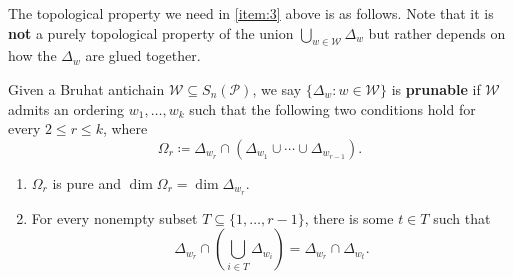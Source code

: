 
The topological property we need in \eqref{item:3} above is as follows. Note that it is \textbf{not} a purely topological property of the union $\bigcup_{w\in \mathcal W}\Delta_w$ but rather depends on how the $\Delta_w$ are glued together.

\begin{definition}\label{def:prunable}
    Given a Bruhat antichain $\mathcal{W}\subseteq S_n(\mathcal{P})$, we say $\{\Delta_w:w\in \mathcal{W}\}$ is \textbf{prunable} if \(\mathcal W\) admits an ordering $w_1,\ldots,w_k$ such that the following two conditions hold for every \(2\le r\le k\), where
    \[\Omega_r\coloneqq\Delta_{w_r}\cap(\Delta_{w_1}\cup\cdots\cup\Delta_{w_{r-1}}).\]
    \begin{enumerate}
    \item[(a)]\(\Omega_r\) is pure and $\dim\Omega_r = \dim\Delta_{w_r}$.
    \item[(b)] For every nonempty subset \(T\subseteq\{1,\ldots,r-1\}\), there is some \(t\in T\) such that $$\Delta_{w_r}\cap \left(\bigcup_{i\in T}\Delta_{w_i}\right) = \Delta_{w_r}\cap \Delta_{w_t}.$$ 
    \end{enumerate}
\end{definition}

